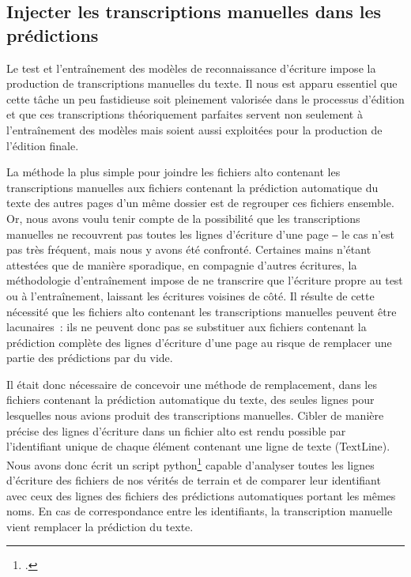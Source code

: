 \documentclass[a4paper,12pt,twoside]{book}
\begin{document}
			\subsection{Injecter les transcriptions manuelles dans les prédictions}
				\label{injection}
				Le test et l'entraînement des modèles de reconnaissance d'écriture impose la production de transcriptions manuelles du texte. Il nous est apparu essentiel que cette tâche un peu fastidieuse soit pleinement valorisée dans le processus d'édition et que ces transcriptions théoriquement parfaites servent non seulement à l'entraînement des modèles mais soient aussi exploitées pour la production de l'édition finale.
				
				La méthode la plus simple pour joindre les fichiers \gls{alto} contenant les transcriptions manuelles aux fichiers contenant la prédiction automatique du texte des autres pages d'un même dossier est de regrouper ces fichiers ensemble. Or, nous avons voulu tenir compte de la possibilité que les transcriptions manuelles ne recouvrent pas toutes les lignes d'écriture d'une page ‒ le cas n'est pas très fréquent, mais nous y avons été confronté. Certaines mains n'étant attestées que de manière sporadique, en compagnie d'autres écritures, la méthodologie d'entraînement impose de ne transcrire que l'écriture propre au test ou à l'entraînement, laissant les écritures voisines de côté. Il résulte de cette nécessité que les fichiers \gls{alto} contenant les transcriptions manuelles peuvent être lacunaires~: ils ne peuvent donc pas se substituer aux fichiers contenant la prédiction complète des lignes d'écriture d'une page au risque de remplacer une partie des prédictions par du vide. 
				
				Il était donc nécessaire de concevoir une méthode de remplacement, dans les fichiers contenant la prédiction automatique du texte, des seules lignes pour lesquelles nous avions produit des transcriptions manuelles. Cibler de manière précise des lignes d'écriture dans un fichier \gls{alto} est rendu possible par l'identifiant unique de chaque élément contenant une ligne de texte (\textsf{TextLine}). Nous avons donc écrit un script python\footcite{biayInjectTranscriptPy2022a} capable d'analyser toutes les lignes d'écriture des fichiers de nos vérités de terrain et de comparer leur identifiant avec ceux des lignes des fichiers des prédictions automatiques portant les mêmes noms. En cas de correspondance entre les identifiants, la transcription manuelle vient remplacer la prédiction du texte.
			
\end{document}

